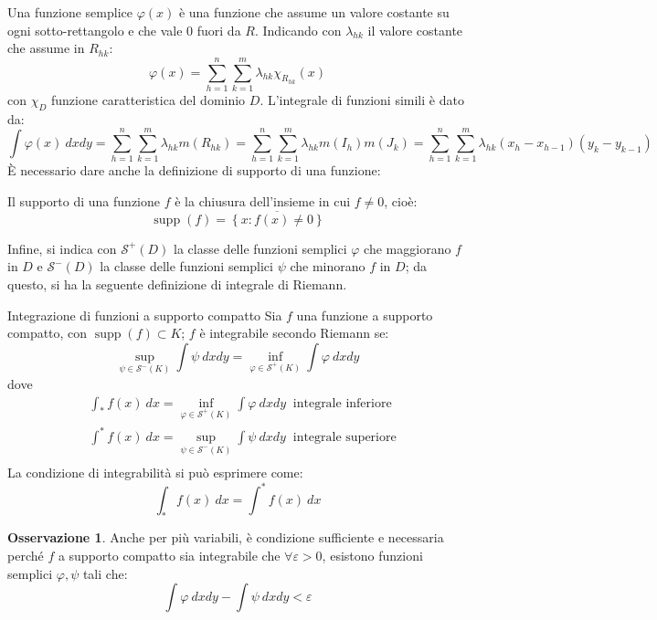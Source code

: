 \documentclass[11pt, a4paper]{scrartcl}
\theoremstyle{definition}
\numberwithin{esempio}{section}
\theoremstyle{definition}
\newtheorem{obs}{Osservazione}
\numberwithin{obs}{section}
\numberwithin{nota}{section}
\numberwithin{equation}{subsection}
\begin{document}
Una funzione semplice $\varphi (x)$ \`e una funzione che assume un valore costante su ogni sotto-rettangolo e che vale $0$ fuori da $R$. Indicando con $\lambda _{hk}$ il valore costante che assume in $R_{hk} $:
\begin{equation}
	\varphi (x)= \sum_{h=1}^{n} \sum_{k=1}^{m} \lambda _{hk} \chi _{R_{hk} } (x)
\end{equation}
con $\chi _D$ funzione caratteristica del dominio $D$. L'integrale di funzioni simili \`e dato da:
\begin{equation}
	\int \varphi (x) \ dxdy = \sum_{h=1}^{n} \sum_{k=1}^{m} \lambda _{hk} m(R_{hk} )= \sum_{h=1}^{n} \sum_{k=1}^{m} \lambda _{hk} m(I_h) m(J_k) = \sum_{h=1}^{n} \sum_{k=1}^{m} \lambda _{hk} (x_h -x_{h-1} ) (y_k - y_{k-1} )
\end{equation}
\`E necessario dare anche la definizione di supporto di una funzione:
\begin{definizione}
	{}{}
	Il supporto di una funzione $f$ \`e la chiusura dell'insieme in cui $f\neq 0$, cio\`e:
	\begin{equation}
		\operatorname{supp} (f) = \overline{\left\{ x : f(x) \neq 0 \right\} }
	\end{equation}
\end{definizione}
\noindent Infine, si indica con $\mathscr{S}^+(D)$ la classe delle funzioni semplici $\varphi $ che maggiorano $f$ in $D$ e $\mathscr{S}^-(D)$ la classe delle funzioni semplici $\psi $ che minorano $f$ in $D$; da questo, si ha la seguente definizione di integrale di Riemann.
\begin{definizione}
	{Integrazione di funzioni a supporto compatto}{}
	Sia $f$ una funzione a supporto compatto, con $\operatorname{supp} (f) \subset K$; $f$ \`e integrabile secondo Riemann se:
	\begin{equation}
		\sup_{\psi \in \mathscr{S}^-(K)}  \int \psi  \ dx dy = \inf_{\varphi \in \mathscr{S}^+(K)}  \int \varphi \ dxdy
	\end{equation}
	dove
	\begin{equation}
		\begin{split}
			&\int_{*} f(x) \ dx =  \inf_{\varphi \in \mathscr{S}^+(K)}  \int \varphi \ dxdy \ \text{ integrale inferiore} \\
			&\int^{*} f(x) \ dx =  \sup_{\psi  \in \mathscr{S}^-(K)}  \int \psi  \ dxdy \ \text{ integrale superiore} \\
		\end{split}
	\end{equation}
	La condizione di integrabilit\`a si pu\`o esprimere come:
	\begin{equation}
		\int_{*} f(x) \ dx= \int^{*} f(x) \ dx
	\end{equation}
\end{definizione}
\begin{obs}
	Anche per pi\`u variabili, \`e condizione sufficiente e necessaria perch\'e $f$ a supporto compatto sia integrabile che $\forall \varepsilon >0$, esistono funzioni semplici $\varphi ,\psi $ tali che:
	\begin{equation}
		\int \varphi  \ dxdy - \int \psi  \ dxdy < \varepsilon 
	\end{equation}
\end{obs}
\end{document}
